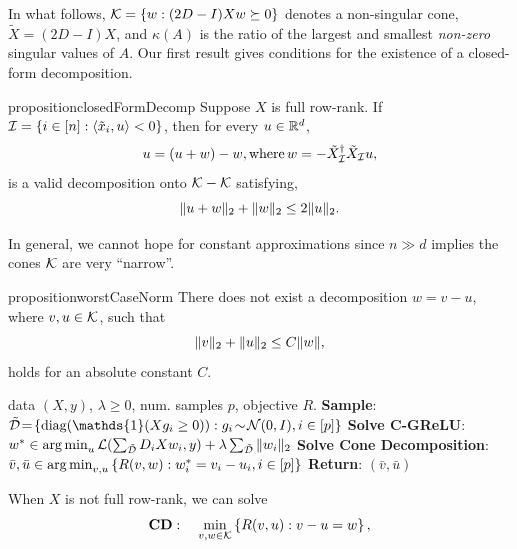 In what follows, \( \mathcal{K} = \left\{w : (2 D - I) X w \succeq 0\right\} \) denotes a non-singular cone, \( \tilde X = (2 D - I) X \), and \( \kappa(A) \) is the ratio of the largest and smallest \emph{non-zero} singular values of \( A \).
Our first result gives conditions for the existence of a closed-form
decomposition.
\begin{restatable}{proposition}{closedFormDecomp}\label{prop:closed-form-decomp}
    Suppose \( X \) is full row-rank.
    If \( \mathcal{I} = \left\{i \in [n] : \left\langle\tilde x_i, u\right\rangle < 0 \right\} \), then for every \( u \in \mathbb{R}^d \),
    \[
        u = \left(u + w\right) - w, \text{where} \,  w = - \tilde X_{\mathcal{I}}^\dagger \tilde X_{\mathcal{I}} u,
    \]
    is a valid decomposition onto \( \mathcal{K} - \mathcal{K} \) satisfying,
    \[
        \|u + w\|_2 + \|w\|_2 \leq 2 \|u\|_2.
    \]
\end{restatable}
In general, we cannot hope for constant approximations since \( n \gg d \) implies
the cones \( \mathcal{K} \) are very ``narrow''.
\begin{restatable}{proposition}{worstCaseNorm}\label{prop:worst-case-norm}
    There does not exist a decomposition \( w = v - u \), where \( v, u \in \mathcal{K} \), such that
    \[
        \|v\|_2 + \|u\|_2 \leq C \|w\|,
    \]
    holds for an absolute constant \( C \).
\end{restatable}
\begin{algorithm}[tb]
    \caption{Solving C-ReLU by Cone Decomposition}
    \label{alg:cone-decomp}
    \begin{algorithmic}
         data \( (X, y) \), \( \lambda \geq 0 \), num. samples \( p \), objective \( R \).
        \STATE \textbf{Sample}: \( \tilde \calD \!=\! \cbr{\diag(\mathds{1}(X g_i \geq 0)) :  g_i \!\sim \!\calN(0, I), i \in [p] } \)
        \STATE \textbf{Solve C-GReLU}:
        \STATE \hspace{1em} \( w^* \in \mathop{\rm arg\,min}_{u} \mathcal{L}(\sum_{\tilde {\mathcal{D}}} D_i X w_i, y) + \lambda \sum_{\tilde {\mathcal{D}}} \|w_i\|_2\)
        \STATE \textbf{Solve Cone Decomposition}:
        \STATE \hspace{1em} \( \bar v, \bar u \in \mathop{\rm arg\,min}_{v, u} \left\{ R(v, w) : w_i^* = v_i - u_i, i \in [p] \right\} \)
        \STATE \textbf{Return}: \((\bar v, \bar u)\)
    \end{algorithmic}
\end{algorithm}
When \( X \) is not full row-rank, we can solve
\begin{equation}\label{eq:decomposition-program}
    \begin{aligned}
        \textbf{CD}: \quad \min_{v, w \in \mathcal{K}} \left\{ R(v, u) : v - u = w \right\},
    \end{aligned}
\end{equation}
